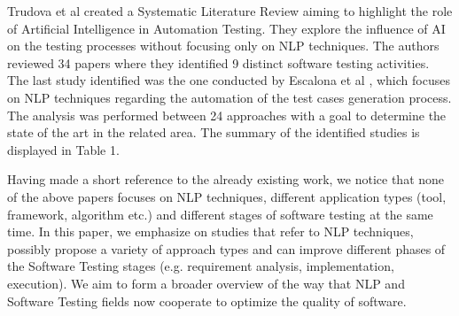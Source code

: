 Trudova et al \cite{battina2019artificial} created a Systematic Literature Review aiming to highlight the role of Artificial Intelligence in Automation Testing. 
They explore the influence of AI on the testing processes without focusing only on NLP techniques. The authors reviewed 34 papers where they identified 9 distinct software testing activities. 
The last study identified was the one conducted by Escalona et al \cite{escalona2011overview}, which focuses on NLP techniques regarding the automation of the test cases generation process. 
The analysis was performed between 24 approaches with a goal to determine the state of the art in the related area. The summary of the identified studies is displayed in Table 1. \\

\begin{table}
\end{table}


Having made a short reference to the already existing work, we notice that none of the above papers focuses on NLP techniques, different application types (tool, framework, algorithm etc.) and 
different stages of software testing at the same time. In this paper, we emphasize on studies that refer to NLP techniques, possibly propose a variety of approach types and can improve different phases 
of the Software Testing stages (e.g. requirement analysis, implementation, execution). We aim to form a broader overview of the way that NLP and Software Testing fields now cooperate to optimize 
the quality of software.